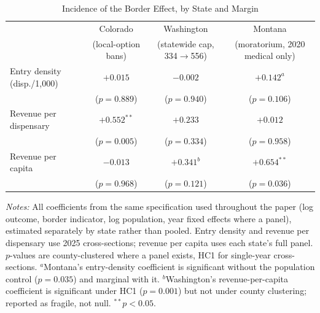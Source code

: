 \begin{table}[htbp]
\centering
\caption{Incidence of the Border Effect, by State and Margin}
\label{tab:incidence}
\small
\begin{tabular}{lccc}
\toprule
& Colorado & Washington & Montana \\
& (local-option bans) & (statewide cap, 334$\to$556) & (moratorium, 2020 medical only) \\
\midrule
Entry density (disp./1{,}000) & $+0.015$ & $-0.002$ & $+0.142^{a}$ \\
& ($p=0.889$) & ($p=0.940$) & ($p=0.106$) \\
Revenue per dispensary & $+0.552^{**}$ & $+0.233$ & $+0.012$ \\
& ($p=0.005$) & ($p=0.334$) & ($p=0.958$) \\
Revenue per capita & $-0.013$ & $+0.341^{b}$ & $+0.654^{**}$ \\
& ($p=0.968$) & ($p=0.121$) & ($p=0.036$) \\
\bottomrule
\end{tabular}
\begin{minipage}{0.95\textwidth}
\vspace{0.3em}
\footnotesize
\textit{Notes:} All coefficients from the same specification used throughout the paper (log outcome,
border indicator, log population, year fixed effects where a panel), estimated separately by state
rather than pooled. Entry density and revenue per dispensary use 2025 cross-sections; revenue per capita
uses each state's full panel. $p$-values are county-clustered where a panel exists, HC1 for single-year
cross-sections. $^{a}$Montana's entry-density coefficient is significant without the population control
($p=0.035$) and marginal with it. $^{b}$Washington's revenue-per-capita coefficient is significant under
HC1 ($p=0.001$) but not under county clustering; reported as fragile, not null. $^{**}p<0.05$.
\end{minipage}
\end{table}
